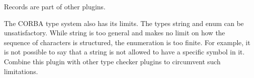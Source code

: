 \begin{DoxyCode}{0}
\end{DoxyCode}


Records are part of other plugins.

The {\ttfamily C\+O\+R\+BA} type system also has its limits. The types {\ttfamily string} and {\ttfamily enum} can be unsatisfactory. While string is too general and makes no limit on how the sequence of characters is structured, the enumeration is too finite. For example, it is not possible to say that a string is not allowed to have a specific symbol in it. Combine this plugin with other type checker plugins to circumvent such limitations. 